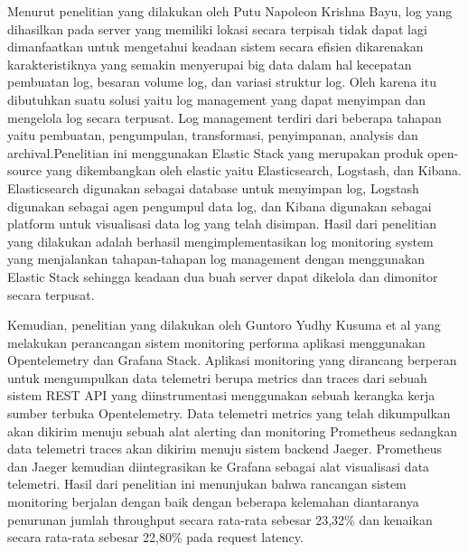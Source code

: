   Menurut penelitian yang dilakukan oleh Putu Napoleon Krishna Bayu, log yang dihasilkan pada server yang memiliki lokasi secara terpisah tidak dapat lagi dimanfaatkan untuk mengetahui keadaan sistem secara efisien dikarenakan karakteristiknya yang semakin menyerupai big data dalam hal kecepatan pembuatan log, besaran volume log, dan variasi struktur log. Oleh karena itu dibutuhkan suatu solusi yaitu log management yang dapat menyimpan dan mengelola log secara terpusat. Log management terdiri dari beberapa tahapan yaitu pembuatan, pengumpulan, transformasi, penyimpanan, analysis dan archival.Penelitian ini menggunakan Elastic Stack yang merupakan produk open-source yang dikembangkan oleh elastic yaitu Elasticsearch, Logstash, dan Kibana. Elasticsearch digunakan sebagai database untuk menyimpan log, Logstash digunakan sebagai agen pengumpul data log, dan Kibana digunakan sebagai platform untuk visualisasi data log yang telah disimpan. Hasil dari penelitian yang dilakukan adalah berhasil mengimplementasikan log monitoring system yang menjalankan tahapan-tahapan log management dengan menggunakan Elastic Stack sehingga keadaan dua buah server dapat dikelola dan dimonitor secara terpusat.

  Kemudian, penelitian yang dilakukan oleh Guntoro Yudhy Kusuma et al yang melakukan perancangan sistem monitoring performa aplikasi menggunakan Opentelemetry dan Grafana Stack. Aplikasi monitoring yang dirancang berperan untuk mengumpulkan data telemetri berupa metrics dan traces dari sebuah sistem REST API yang diinstrumentasi menggunakan sebuah kerangka kerja sumber terbuka Opentelemetry. Data telemetri metrics yang telah dikumpulkan akan dikirim menuju sebuah alat alerting dan monitoring Prometheus sedangkan data telemetri traces akan dikirim menuju sistem backend Jaeger. Prometheus dan Jaeger kemudian diintegrasikan ke Grafana sebagai alat visualisasi data telemetri. Hasil dari penelitian ini menunjukan bahwa rancangan sistem monitoring berjalan dengan baik dengan beberapa kelemahan diantaranya penurunan jumlah throughput secara rata-rata sebesar 23,32\% dan kenaikan secara rata-rata sebesar 22,80\% pada request latency. 
  
